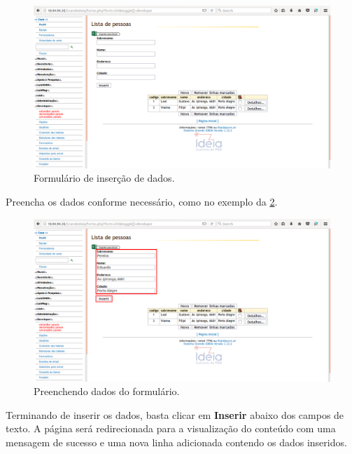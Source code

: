 \documentclass[9pt]{report}
\begin{document}
{      \begin{figure}[H]
        \includegraphics[width=\textwidth]{2_Formularios/2_Criacao_de_formularios/16.png}
        \caption{Formulário de inserção de dados.}
        \label{fig:inserdados}
      \end{figure}

      Preencha os dados conforme necessário, como no exemplo da \figurename{ \ref{fig:prdados}}.
      
      \begin{figure}[H]
        \includegraphics[width=\textwidth]{2_Formularios/2_Criacao_de_formularios/17.png}
        \caption{Preenchendo dados do formulário.}
        \label{fig:prdados}
      \end{figure}

      Terminando de inserir os dados, basta clicar em
      \textbf{Inserir} abaixo dos campos de texto. A página será
      redirecionada para a visualização do conteúdo com uma mensagem
      de sucesso e uma nova linha adicionada contendo os dados
      inseridos.

}
\end{document}
